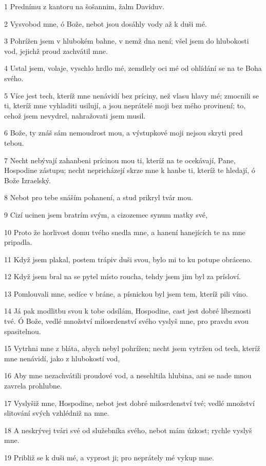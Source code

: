 \par 1 Prednímu z kantoru na šošannim, žalm Daviduv.
\par 2 Vysvobod mne, ó Bože, nebot jsou dosáhly vody až k duši mé.
\par 3 Pohrížen jsem v hlubokém bahne, v nemž dna není; všel jsem do hlubokosti vod, jejichž proud zachvátil mne.
\par 4 Ustal jsem, volaje, vyschlo hrdlo mé, zemdlely oci mé od ohlídání se na te Boha svého.
\par 5 Více jest tech, kteríž mne nenávidí bez príciny, než vlasu hlavy mé; zmocnili se ti, kteríž mne vyhladiti usilují, a jsou neprátelé moji bez mého provinení; to, cehož jsem nevydrel, nahražovati jsem musil.
\par 6 Bože, ty znáš sám nemoudrost mou, a výstupkové moji nejsou skryti pred tebou.
\par 7 Necht nebývají zahanbeni prícinou mou ti, kteríž na te ocekávají, Pane, Hospodine zástupu; necht nepricházejí skrze mne k hanbe ti, kteríž te hledají, ó Bože Izraelský.
\par 8 Nebot pro tebe snáším pohanení, a stud prikryl tvár mou.
\par 9 Cizí ucinen jsem bratrím svým, a cizozemec synum matky své,
\par 10 Proto že horlivost domu tvého snedla mne, a hanení hanejících te na mne pripadla.
\par 11 Když jsem plakal, postem trápiv duši svou, bylo mi to ku potupe obráceno.
\par 12 Když jsem bral na se pytel místo roucha, tehdy jsem jim byl za prísloví.
\par 13 Pomlouvali mne, sedíce v bráne, a písnickou byl jsem tem, kteríž pili víno.
\par 14 Já pak modlitbu svou k tobe odsílám, Hospodine, cast jest dobré líbeznosti tvé. Ó Bože, vedlé množství milosrdenství svého vyslyš mne, pro pravdu svou spasitelnou.
\par 15 Vytrhni mne z bláta, abych nebyl pohrížen; necht jsem vytržen od tech, kteríž mne nenávidí, jako z hlubokostí vod,
\par 16 Aby mne nezachvátili proudové vod, a nesehltila hlubina, ani se nade mnou zavrela prohlubne.
\par 17 Vyslyšiž mne, Hospodine, nebot jest dobré milosrdenství tvé; vedlé množství slitování svých vzhlédniž na mne.
\par 18 A neskrývej tvári své od služebníka svého, nebot mám úzkost; rychle vyslyš mne.
\par 19 Približ se k duši mé, a vyprost ji; pro neprátely mé vykup mne.
